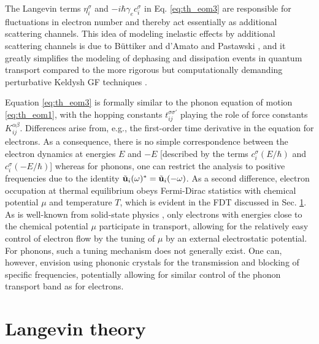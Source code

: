 The Langevin terms $\eta_i^{\sigma}$ and $-i\hbar \gamma_e c_i^{\sigma}$ in Eq. \eqref{eq:th_eom3} are responsible for fluctuations in electron number and thereby act essentially as additional scattering channels. This idea of modeling inelastic effects by additional scattering channels is due to B\"uttiker \cite{buttiker86} and d'Amato and Pastawski \cite{damato90}, and it greatly simplifies the modeling of dephasing and dissipation events in quantum transport compared to the more rigorous but computationally demanding perturbative Keldysh GF techniques \cite{haugjauho}.

Equation \eqref{eq:th_eom3} is formally similar to the phonon equation of motion \eqref{eq:th_eom1}, with the hopping constants $t_{ij}^{\sigma\sigma'}$ playing the role of force constants $K_{ij}^{\alpha\beta}$. Differences arise from, e.g., the first-order time derivative in the equation for electrons. As a consequence, there is no simple correspondence between the electron dynamics at energies $E$ and $-E$ [described by the terms $c_i^{\sigma}(E/\hbar)$ and $c_i^{\sigma}(-E/\hbar)$] whereas for phonons, one can restrict the analysis to positive frequencies due to the identity $\tilde{\mathbf{u}}_i(\omega)^*=\tilde{\mathbf{u}}_i(-\omega)$. As a second difference, electron occupation at thermal equilibrium obeys Fermi-Dirac statistics with chemical potential $\mu$ and temperature $T$, which is evident in the FDT discussed in Sec. \ref{sec:th_langevin}. As is well-known from solid-state physics \cite{ashcroftmermin}, only electrons with energies close to the chemical potential $\mu$ participate in transport, allowing for the relatively easy control of electron flow by the tuning of $\mu$ by an external electrostatic potential. For phonons, such a tuning mechanism does not generally exist. One can, however, envision using phononic crystals \cite{maldovan13} for the transmission and blocking of specific frequencies, potentially allowing for similar control of the phonon transport band as for electrons.  



\section{Langevin theory}
\label{sec:th_langevin}

